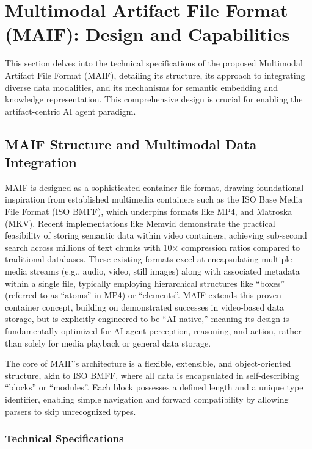 \documentclass[conference]{IEEEtran}
\begin{document}
\section{Multimodal Artifact File Format (MAIF): Design and Capabilities}
\label{sec:maif-design}

This section delves into the technical specifications of the proposed Multimodal Artifact File Format (MAIF), detailing its structure, its approach to integrating diverse data modalities, and its mechanisms for semantic embedding and knowledge representation. This comprehensive design is crucial for enabling the artifact-centric AI agent paradigm.

\subsection{MAIF Structure and Multimodal Data Integration}

MAIF is designed as a sophisticated container file format, drawing foundational inspiration from established multimedia containers such as the ISO Base Media File Format (ISO BMFF), which underpins formats like MP4, and Matroska (MKV)\cite{ref31}. Recent implementations like Memvid demonstrate the practical feasibility of storing semantic data within video containers, achieving sub-second search across millions of text chunks with 10× compression ratios compared to traditional databases. These existing formats excel at encapsulating multiple media streams (e.g., audio, video, still images) along with associated metadata within a single file, typically employing hierarchical structures like ``boxes'' (referred to as ``atoms'' in MP4) or ``elements''\cite{ref32}. MAIF extends this proven container concept, building on demonstrated successes in video-based data storage, but is explicitly engineered to be ``AI-native,'' meaning its design is fundamentally optimized for AI agent perception, reasoning, and action, rather than solely for media playback or general data storage.

The core of MAIF's architecture is a flexible, extensible, and object-oriented structure, akin to ISO BMFF, where all data is encapsulated in self-describing ``blocks'' or ``modules''\cite{ref32}. Each block possesses a defined length and a unique type identifier, enabling simple navigation and forward compatibility by allowing parsers to skip unrecognized types\cite{ref32}.

\subsubsection{Technical Specifications}
\end{document}
